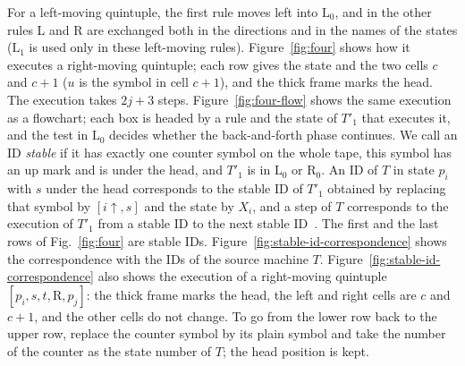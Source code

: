 \documentclass{article}
\theoremstyle{definition}
\theoremstyle{remark}
\newcommand{\rmL}{\mathrm{L}}
\newcommand{\rmR}{\mathrm{R}}
\begin{document}
For a left-moving quintuple, the first rule moves left into $\rmL_0$, and in the other rules L and R are exchanged both in the directions and in the names of the states ($\rmL_1$ is used only in these left-moving rules).
Figure~\ref{fig:four} shows how it executes a right-moving quintuple; each row gives the state and the two cells $c$ and $c+1$ ($u$ is the symbol in cell $c+1$), and the thick frame marks the head.
The execution takes $2j+3$ steps.
Figure~\ref{fig:four-flow} shows the same execution as a flowchart; each box is headed by a rule and the state of $T'_1$ that executes it, and the test in $\rmL_0$ decides whether the back-and-forth phase continues.
We call an ID \emph{stable} if it has exactly one counter symbol on the whole tape, this symbol has an up mark and is under the head, and $T'_1$ is in $\rmL_0$ or $\rmR_0$.
An ID of $T$ in state $p_i$ with $s$ under the head corresponds to the stable ID of $T'_1$ obtained by replacing that symbol by $[i{\uparrow},s]$ and the state by $X_i$, and a step of $T$ corresponds to the execution of $T'_1$ from a stable ID to the next stable ID~\cite[proof of Thm.~5.5]{Morita17}. The first and the last rows of Fig.~\ref{fig:four} are stable IDs. Figure~\ref{fig:stable-id-correspondence} shows the correspondence with the IDs of the source machine $T$.
Figure~\ref{fig:stable-id-correspondence} also shows the execution of a right-moving quintuple $[p_i,s,t,\rmR,p_j]$: the thick frame marks the head, the left and right cells are $c$ and $c+1$, and the other cells do not change. To go from the lower row back to the upper row, replace the counter symbol by its plain symbol and take the number of the counter as the state number of $T$; the head position is kept.
\end{document}
